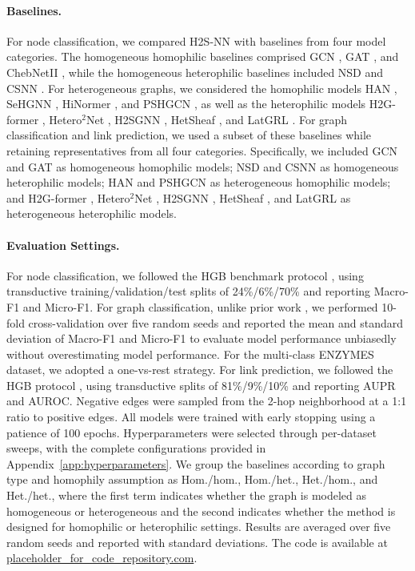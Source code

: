 \documentclass[sigconf,anonymous,review]{acmart}
\newcommand{\method}{\textsc{H2S-NN}}
\begin{document}
\paragraph{Baselines.}
For node classification, we compared \method{} with baselines from four model categories. The homogeneous homophilic baselines comprised GCN \cite{kipf2017gcn}, GAT \cite{velickovic2018gat}, and ChebNetII \cite{he2022chebnetii}, while the homogeneous heterophilic baselines included NSD \cite{bodnar2022neural} and CSNN \cite{ribeiro2026cooperative}. For heterogeneous graphs, we considered the homophilic models HAN \cite{wang2019han}, SeHGNN \cite{yang2023sehgnn}, HiNormer \cite{mao2023hinormer}, and PSHGCN \cite{he2024spectral}, as well as the heterophilic models H2G-former \cite{lin2025heterophily}, Hetero$^2$Net \cite{li2025hetero2net}, H2SGNN \cite{lu2026addressing}, HetSheaf \cite{braithwaite2024heterogeneous}, and LatGRL \cite{shen2025heterophily}.
For graph classification and link prediction, we used a subset of these baselines while retaining representatives from all four categories. Specifically, we included GCN \cite{kipf2017gcn} and GAT \cite{velickovic2018gat} as homogeneous homophilic models; NSD \cite{bodnar2022neural} and CSNN \cite{ribeiro2026cooperative} as homogeneous heterophilic models; HAN \cite{wang2019han} and PSHGCN \cite{he2024spectral} as heterogeneous homophilic models; and H2G-former \cite{lin2025heterophily}, Hetero$^2$Net \cite{li2025hetero2net}, H2SGNN \cite{lu2026addressing}, HetSheaf \cite{braithwaite2024heterogeneous}, and LatGRL \cite{shen2025heterophily} as heterogeneous heterophilic models.
\paragraph{Evaluation Settings.}
For node classification, we followed the HGB benchmark protocol \cite{lv2021hgb}, using transductive training/validation/test splits of 24\%/6\%/70\% and reporting Macro-F1 and Micro-F1. For graph classification, unlike prior work \cite{zhang2018end,amouzad2024graphunet}, we performed 10-fold cross-validation over five random seeds and reported the mean and standard deviation of Macro-F1 and Micro-F1 to evaluate model performance unbiasedly without overestimating model performance. For the multi-class ENZYMES dataset, we adopted a one-vs-rest strategy. For link prediction, we followed the HGB protocol \cite{lv2021hgb}, using transductive splits of 81\%/9\%/10\% and reporting AUPR and AUROC. Negative edges were sampled from the 2-hop neighborhood at a 1:1 ratio to positive edges. All models were trained with early stopping using a patience of 100 epochs. Hyperparameters were selected through per-dataset sweeps, with the complete configurations provided in Appendix~\ref{app:hyperparameters}. We group the baselines according to graph type and homophily assumption as Hom./hom., Hom./het., Het./hom., and Het./het., where the first term indicates whether the graph is modeled as homogeneous or heterogeneous and the second indicates whether the method is designed for homophilic or heterophilic settings. Results are averaged over five random seeds and reported with standard deviations. The code is available at \url{placeholder_for_code_repository.com}.
\end{document}
